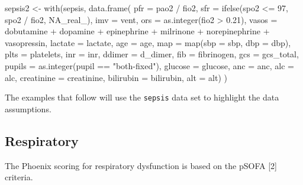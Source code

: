 \documentclass[
  letterpaper,
  DIV=11,
  numbers=noendperiod]{scrartcl}
\newenvironment{Shaded}{\begin{snugshade}}{\end{snugshade}}
\newcommand{\AttributeTok}[1]{\textcolor[rgb]{0.40,0.45,0.13}{#1}}
\newcommand{\ConstantTok}[1]{\textcolor[rgb]{0.56,0.35,0.01}{#1}}
\newcommand{\DecValTok}[1]{\textcolor[rgb]{0.68,0.00,0.00}{#1}}
\newcommand{\FloatTok}[1]{\textcolor[rgb]{0.68,0.00,0.00}{#1}}
\newcommand{\FunctionTok}[1]{\textcolor[rgb]{0.28,0.35,0.67}{#1}}
\newcommand{\NormalTok}[1]{\textcolor[rgb]{0.00,0.23,0.31}{#1}}
\newcommand{\OtherTok}[1]{\textcolor[rgb]{0.00,0.23,0.31}{#1}}
\newcommand{\SpecialCharTok}[1]{\textcolor[rgb]{0.37,0.37,0.37}{#1}}
\newcommand{\StringTok}[1]{\textcolor[rgb]{0.13,0.47,0.30}{#1}}
\begin{document}
\begin{Shaded}
\begin{Highlighting}[]
\NormalTok{sepsis2 }\OtherTok{\textless{}{-}}
  \FunctionTok{with}\NormalTok{(sepsis,}
    \FunctionTok{data.frame}\NormalTok{(}
        \AttributeTok{pfr =}\NormalTok{ pao2 }\SpecialCharTok{/}\NormalTok{ fio2,}
        \AttributeTok{sfr =} \FunctionTok{ifelse}\NormalTok{(spo2 }\SpecialCharTok{\textless{}=} \DecValTok{97}\NormalTok{, spo2 }\SpecialCharTok{/}\NormalTok{ fio2, }\ConstantTok{NA\_real\_}\NormalTok{),}
        \AttributeTok{imv =}\NormalTok{ vent,}
        \AttributeTok{ors =} \FunctionTok{as.integer}\NormalTok{(fio2 }\SpecialCharTok{\textgreater{}} \FloatTok{0.21}\NormalTok{),}
        \AttributeTok{vasos =}\NormalTok{ dobutamine }\SpecialCharTok{+}\NormalTok{ dopamine }\SpecialCharTok{+}\NormalTok{ epinephrine }\SpecialCharTok{+}\NormalTok{ milrinone }\SpecialCharTok{+}\NormalTok{ norepinephrine }\SpecialCharTok{+}\NormalTok{ vasopressin,}
        \AttributeTok{lactate =}\NormalTok{ lactate,}
        \AttributeTok{age =}\NormalTok{ age,}
        \AttributeTok{map =} \FunctionTok{map}\NormalTok{(}\AttributeTok{sbp =}\NormalTok{ sbp, }\AttributeTok{dbp =}\NormalTok{ dbp),}
        \AttributeTok{plts =}\NormalTok{ platelets,}
        \AttributeTok{inr =}\NormalTok{ inr,}
        \AttributeTok{ddimer =}\NormalTok{ d\_dimer,}
        \AttributeTok{fib =}\NormalTok{ fibrinogen,}
        \AttributeTok{gcs =}\NormalTok{ gcs\_total,}
        \AttributeTok{pupils =} \FunctionTok{as.integer}\NormalTok{(pupil }\SpecialCharTok{==} \StringTok{"both{-}fixed"}\NormalTok{),}
        \AttributeTok{glucose =}\NormalTok{ glucose,}
        \AttributeTok{anc =}\NormalTok{ anc,}
        \AttributeTok{alc =}\NormalTok{ alc,}
        \AttributeTok{creatinine =}\NormalTok{ creatinine,}
        \AttributeTok{bilirubin =}\NormalTok{ bilirubin,}
        \AttributeTok{alt =}\NormalTok{ alt)}
\NormalTok{  )}
\end{Highlighting}
\end{Shaded}

The examples that follow will use the \texttt{sepsis} data set to
highlight the data assumptions.

\subsection{Respiratory}\label{respiratory}

The Phoenix scoring for respiratory dysfunction is based on the pSOFA
{[}2{]} criteria.
\end{document}
